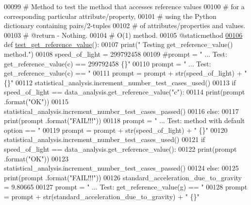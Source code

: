 \begin{DoxyCode}
00099     \textcolor{comment}{#   Method to test the method that accesses reference values}
00100     \textcolor{comment}{#       for a corresponding particular attribute/property,}
00101     \textcolor{comment}{#       using the Python dictionary containing pairs/2-tuples}
00102     \textcolor{comment}{#       of attributes/properties and values.}
00103     \textcolor{comment}{#   @return - Nothing.}
00104     \textcolor{comment}{#   O(1) method.}
00105     @staticmethod
\hypertarget{test__data__analysis__tool_8py_source_l00106}{}\hyperlink{classstatistics_1_1test__data__analysis__tool_1_1data__analysis__tester_ac5dee1d2f7bb003c3b322ec9692766af}{00106}     \textcolor{keyword}{def }\hyperlink{classstatistics_1_1test__data__analysis__tool_1_1data__analysis__tester_ac5dee1d2f7bb003c3b322ec9692766af}{test\_get\_reference\_value}():
00107         print(\textcolor{stringliteral}{" Testing get\_reference\_value() method."})
00108         speed\_of\_light = 299792458
00109         \textcolor{comment}{#prompt = " ... Test: get\_reference\_value(c) == 299792458       \{\}"}
00110         prompt = \textcolor{stringliteral}{"  ... Test: get\_reference\_value(c) == "}
00111         prompt = prompt + str(speed\_of\_light) + \textcolor{stringliteral}{"       \{\}"}
00112         statistical\_analysis.increment\_number\_test\_cases\_used()
00113         \textcolor{keywordflow}{if} speed\_of\_light == data\_analysis.get\_reference\_value(\textcolor{stringliteral}{"c"}):
00114             print(prompt .format(\textcolor{stringliteral}{"OK"}))
00115             statistical\_analysis.increment\_number\_test\_cases\_passed()
00116         \textcolor{keywordflow}{else}:
00117             print(prompt .format(\textcolor{stringliteral}{"FAIL!!!"}))
00118         prompt = \textcolor{stringliteral}{"  ... Test: method with default option == "}
00119         prompt = prompt + str(speed\_of\_light) + \textcolor{stringliteral}{"   \{\}"}
00120         statistical\_analysis.increment\_number\_test\_cases\_used()
00121         \textcolor{keywordflow}{if} speed\_of\_light == data\_analysis.get\_reference\_value():
00122             print(prompt .format(\textcolor{stringliteral}{"OK"}))
00123             statistical\_analysis.increment\_number\_test\_cases\_passed()
00124         \textcolor{keywordflow}{else}:
00125             print(prompt .format(\textcolor{stringliteral}{"FAIL!!!"}))
00126         standard\_acceleration\_due\_to\_gravity = 9.80665
00127         prompt = \textcolor{stringliteral}{"  ... Test: get\_reference\_value(g) == "}
00128         prompt = prompt + str(standard\_acceleration\_due\_to\_gravity) + \textcolor{stringliteral}{"     \{\}"}

\end{DoxyCode}
